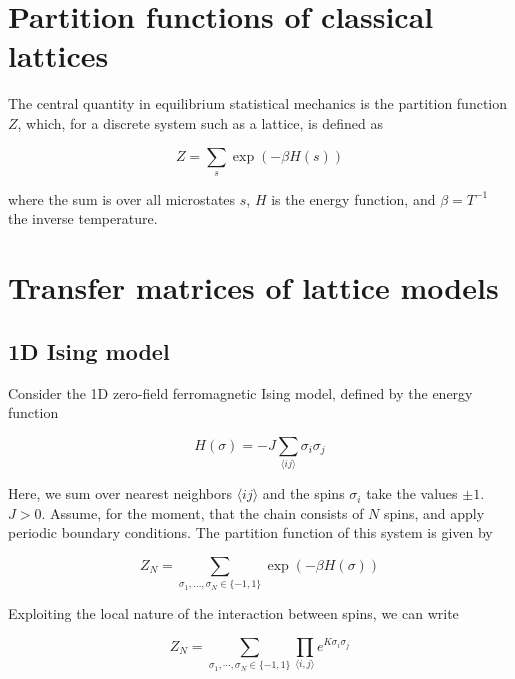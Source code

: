 \section{Partition functions of classical lattices}
The central quantity in equilibrium statistical mechanics is the partition
function $Z$, which, for a discrete system such as a lattice, is defined as

\begin{equation}
  Z = \sum_{s} \exp{(-\beta H(s))}
\end{equation}

where the sum is over all microstates $s$, $H$ is the energy function, and
$\beta = T^{-1}$ the inverse temperature.

\section{Transfer matrices of lattice models}

\subsection{1D Ising model}


Consider the 1D zero-field ferromagnetic Ising model, defined by the energy function

\begin{equation}\label{ising_energy_function}
  H(\sigma) = -J \sum_{\langle i j \rangle} \sigma_i \sigma_j
\end{equation}

Here, we sum over nearest neighbors $\langle i j \rangle$ and the spins
$\sigma_i$ take the values $\pm 1$. $J > 0$. Assume, for the moment, that the chain
consists of $N$ spins, and apply periodic boundary conditions.
The partition function of this system is given by

\begin{equation}
  Z_{N} = \sum_{\sigma_1, \dotsc, \sigma_N \in \{-1, 1\}} \exp (-\beta H(\sigma))
\end{equation}

Exploiting the local nature of the interaction between spins, we can write

\begin{equation}
  Z_{N} = \sum_{\sigma_1, \cdots, \sigma_N \in \{-1, 1\}} \prod_{\langle i, j \rangle} e^{K\sigma_i \sigma_j}
\end{equation}

